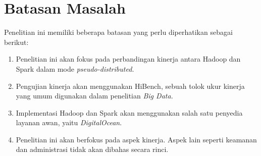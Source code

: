 \section{Batasan Masalah}
Penelitian ini memiliki beberapa batasan yang perlu diperhatikan sebagai berikut:
	\begin{enumerate}
		\item 
		Penelitian ini akan fokus pada perbandingan kinerja antara Hadoop dan Spark dalam mode \textit{pseudo-distributed.}
		\item
		Pengujian kinerja akan menggunakan HiBench, sebuah tolok ukur kinerja yang umum digunakan dalam penelitian \textit{Big Data.}
		\item
		Implementasi Hadoop dan Spark akan menggunakan salah satu penyedia layanan awan, yaitu \textit{DigitalOcean}.
		\item
		Penelitian ini akan berfokus pada aspek kinerja. Aspek lain seperti keamanan dan administrasi tidak akan dibahas secara rinci.
	\end{enumerate}

%
%
%
